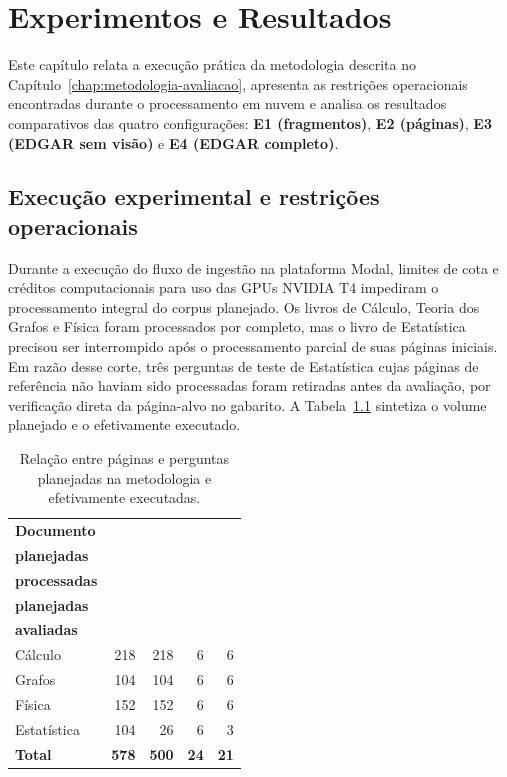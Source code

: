 \chapter{Experimentos e Resultados}
\label{cap:resultados}

Este capítulo relata a execução prática da metodologia descrita no Capítulo~\ref{chap:metodologia-avaliacao}, apresenta as restrições operacionais encontradas durante o processamento em nuvem e analisa os resultados comparativos das quatro configurações: \textbf{E1 (fragmentos)}, \textbf{E2 (páginas)}, \textbf{E3 (EDGAR sem visão)} e \textbf{E4 (EDGAR completo)}.

\section{Execução experimental e restrições operacionais}
\label{sec:execucao-e-restricoes}

Durante a execução do fluxo de ingestão na plataforma Modal, limites de cota e créditos computacionais para uso das GPUs NVIDIA T4 impediram o processamento integral do corpus planejado. Os livros de Cálculo, Teoria dos Grafos e Física foram processados por completo, mas o livro de Estatística precisou ser interrompido após o processamento parcial de suas páginas iniciais. Em razão desse corte, três perguntas de teste de Estatística cujas páginas de referência não haviam sido processadas foram retiradas antes da avaliação, por verificação direta da página-alvo no gabarito. A Tabela~\ref{tab:corpus-edgar} sintetiza o volume planejado e o efetivamente executado.

\begin{table}[H]
    \centering
    \caption{Relação entre páginas e perguntas planejadas na metodologia e efetivamente executadas.}
    \label{tab:corpus-edgar}
    {\ABNTEXfontereduzida
    \begin{tabular}{lrrrr}
        \toprule
        \textbf{Documento} &
        \shortstack{\textbf{Páginas}\\\textbf{planejadas}} &
        \shortstack{\textbf{Páginas}\\\textbf{processadas}} &
        \shortstack{\textbf{Perguntas}\\\textbf{planejadas}} &
        \shortstack{\textbf{Perguntas}\\\textbf{avaliadas}} \\
        \midrule
        Cálculo     & 218 & 218 & 6 & 6 \\
        Grafos      & 104 & 104 & 6 & 6 \\
        Física      & 152 & 152 & 6 & 6 \\
        Estatística & 104 &  26 & 6 & 3 \\
        \midrule
        \textbf{Total} & \textbf{578} & \textbf{500} & \textbf{24} & \textbf{21} \\
        \bottomrule
    \end{tabular}
    }
\end{table}

